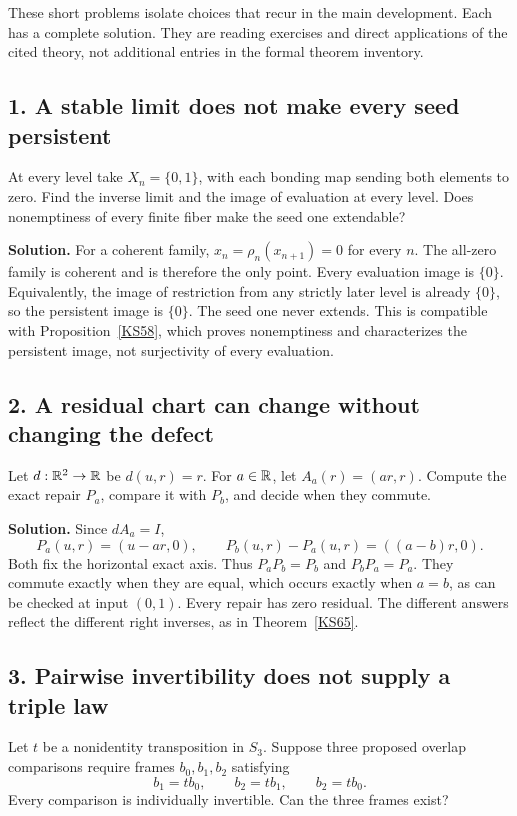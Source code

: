 \clearpage
{}\label{app:workshop}
These short problems isolate choices that recur in the main development. Each has a complete solution. They are reading exercises and direct applications of the cited theory, not additional entries in the formal theorem inventory.

\subsection*{1. A stable limit does not make every seed persistent}
At every level take \(X_n=\{0,1\}\), with each bonding map sending both elements to zero. Find the inverse limit and the image of evaluation at every level. Does nonemptiness of every finite fiber make the seed one extendable?

\textbf{Solution.} For a coherent family, \(x_n=\rho_n(x_{n+1})=0\) for every \(n\). The all-zero family is coherent and is therefore the only point. Every evaluation image is \(\{0\}\). Equivalently, the image of restriction from any strictly later level is already \(\{0\}\), so the persistent image is \(\{0\}\). The seed one never extends. This is compatible with Proposition~\ref{KS58}, which proves nonemptiness and characterizes the persistent image, not surjectivity of every evaluation.

\subsection*{2. A residual chart can change without changing the defect}
Let \(d:\mathbb R^2\to\mathbb R\) be \(d(u,r)=r\). For \(a\in\mathbb R\), let \(A_a(r)=(ar,r)\). Compute the exact repair \(P_a\), compare it with \(P_b\), and decide when they commute.

\textbf{Solution.} Since \(dA_a=I\),
\[
 P_a(u,r)=(u-ar,0),\qquad
 P_b(u,r)-P_a(u,r)=((a-b)r,0).
\]
Both fix the horizontal exact axis. Thus \(P_aP_b=P_b\) and \(P_bP_a=P_a\). They commute exactly when they are equal, which occurs exactly when \(a=b\), as can be checked at input \((0,1)\). Every repair has zero residual. The different answers reflect the different right inverses, as in Theorem~\ref{KS65}.

\subsection*{3. Pairwise invertibility does not supply a triple law}
Let \(t\) be a nonidentity transposition in \(S_3\). Suppose three proposed overlap comparisons require frames \(b_0,b_1,b_2\) satisfying
\[
 b_1=tb_0,\qquad b_2=tb_1,\qquad b_2=tb_0.
\]
Every comparison is individually invertible. Can the three frames exist?


